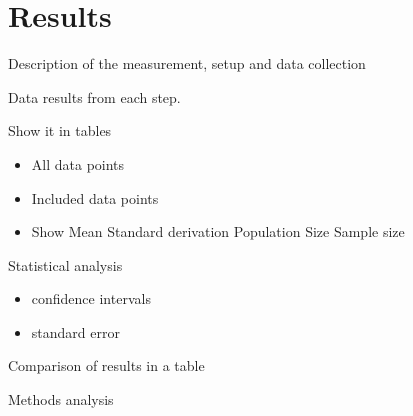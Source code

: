 \chapter{Results\label{results}}
Description of the measurement, setup and data collection

Data results from each step.

Show it in tables
\begin{itemize}
    \item All data points
    \item Included data points
    \item Show
    \subitem Mean
    \subitem Standard derivation
    \subitem Population Size
    \subitem Sample size
\end{itemize}

Statistical analysis
\begin{itemize}
    \item confidence intervals
    \item standard error
\end{itemize}

Comparison of results in a table

Methods analysis